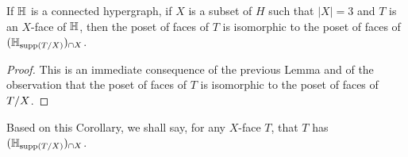  \begin{corollary} 
  \label{instance-construct-general} 
  If ${\mathbb H}$ is a connected hypergraph, if $X$ is a subset of $H$ such that $|X|=3$ and $T$ is an $X$-face of ${\mathbb H}$, then the poset of faces of $T$ is isomorphic to the poset of faces of~$({\mathbb H}_{\operatorname{supp}(T/X)})_{\cap X}$.
\end{corollary}

\begin{proof} This is an immediate consequence of the previous Lemma and of the observation that the poset of faces of $T$ is isomorphic to the poset of faces of $T/X$.
\end{proof}
 
Based on this Corollary, we shall say, for any $X$-face $T$, that $T$ has  
$({\mathbb H}_{\operatorname{supp}(T/X)})_{\cap X}$.





